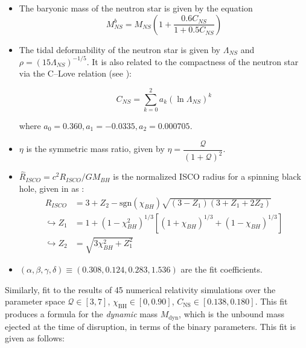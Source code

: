     \begin{itemize}

        \item The baryonic mass of the neutron star is given by the equation $$M_{NS}^b
            = M_{NS} \left(1 + \dfrac{0.6 C_{NS}}{1 + 0.5 C_{NS}} \right)$$

        \item The tidal deformability of the neutron star is given by $\Lambda_{NS}$ and
            $\rho = (15 \Lambda_{NS})^{-1/5}$. It is also related to the compactness of
            the neutron star via the C--Love relation (see \cite{yagi_2017}):

            \begin{equation}
                C_{NS} = \sum_{k=0}^{2} a_k (\ln \Lambda_{NS})^k
            \end{equation}

            where $a_0 = 0.360, a_1 = -0.0335, a_2 = 0.000705$.

        \item $\eta$ is the symmetric mass ratio, given by $ \eta =
            \dfrac{\mathcal{Q}}{(1 + \mathcal{Q})^2} $.

        \item $\hat{R}_{ISCO} = c^2 R_{ISCO} / GM_{BH}$ is the normalized ISCO radius
            for a spinning black hole, given in \cite{bardeen_1972} as :
            \begin{align}
                \label{eq:r_isco}
                \hat{R}_{ISCO} &=
                    3 +
                    Z_2 -
                    \mathrm{sgn}(\chi_{BH}) \sqrt{(3 - Z_1)(3+Z_1 + 2Z_2)} \\
                \hookrightarrow Z_1 &=
                                1 +
                                (1 - \chi_{BH}^2)^{1/3}
                                [
                                    (1 + \chi_{BH})^{1/3} + (1 - \chi_{BH})^{1/3}
                                ] \nonumber \\
                \hookrightarrow Z_2 &=
                                \sqrt{3\chi_{BH}^2 +  Z_1^2} \nonumber
            \end{align}

        \item $(\alpha, \beta, \gamma, \delta) \equiv (0.308, 0.124, 0.283, 1.536)$ are
            the fit coefficients.

    \end{itemize}

    Similarly, \cite{kawaguchi_2016} fit to the results of 45 numerical relativity
    simulations over the parameter space $\mathcal{Q} \in [3,7]$, $\chi_{\mathrm{BH}}
    \in [0, 0.90]$, $C_{\mathrm{NS}} \in [0.138, 0.180]$. This fit produces a formula
    for the \textit{dynamic} mass $M_{\mathrm{dyn}}$, which is the unbound mass ejected
    at the time of disruption, in terms of the binary parameters. This fit is given as
    follows:

